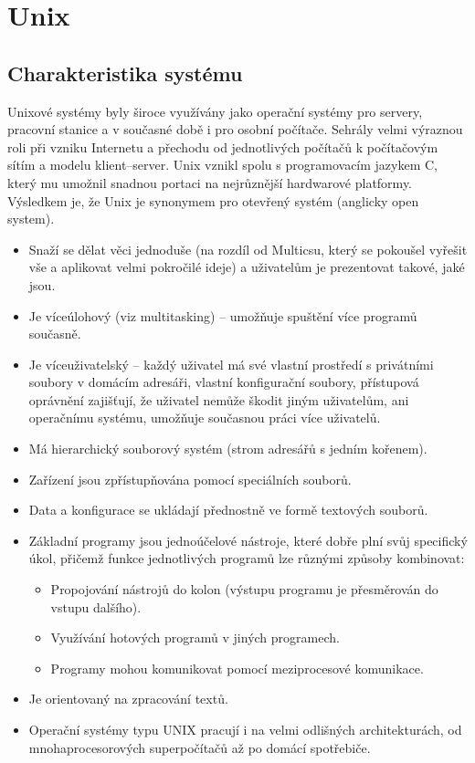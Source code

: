 \section{Unix}
\subsection{Charakteristika systému}
Unixové systémy byly široce využívány jako operační systémy pro servery, pracovní stanice a v současné době i pro osobní počítače. Sehrály velmi výraznou roli při vzniku Internetu a přechodu od jednotlivých počítačů k počítačovým sítím a modelu klient–server. Unix vznikl spolu s programovacím jazykem C, který mu umožnil snadnou portaci na nejrůznější hardwarové platformy. Výsledkem je, že Unix je synonymem pro otevřený systém (anglicky open system).
\begin{itemize}
    \item Snaží se dělat věci jednoduše (na rozdíl od Multicsu, který se pokoušel vyřešit vše a aplikovat velmi pokročilé ideje) a uživatelům je prezentovat takové, jaké jsou.
    \item Je víceúlohový (viz multitasking) – umožňuje spuštění více programů současně.
    \item Je víceuživatelský – každý uživatel má své vlastní prostředí s privátními soubory v domácím adresáři, vlastní konfigurační soubory, přístupová oprávnění zajišťují, že uživatel nemůže škodit jiným uživatelům, ani operačnímu systému, umožňuje současnou práci více uživatelů.
    \item Má hierarchický souborový systém (strom adresářů s jedním kořenem).
    \item Zařízení jsou zpřístupňována pomocí speciálních souborů.
    \item Data a konfigurace se ukládají přednostně ve formě textových souborů.
    \item Základní programy jsou jednoúčelové nástroje, které dobře plní svůj specifický úkol, přičemž funkce jednotlivých programů lze různými způsoby kombinovat:
    \begin{itemize}
        \item Propojování nástrojů do kolon (výstupu programu je přesměrován do vstupu dalšího).
        \item Využívání hotových programů v jiných programech.
        \item Programy mohou komunikovat pomocí meziprocesové komunikace.
    \end{itemize}
    \item Je orientovaný na zpracování textů.
    \item Operační systémy typu UNIX pracují i na velmi odlišných architekturách, od mnohaprocesorových
    superpočítačů až po domácí spotřebiče.
\end{itemize}

